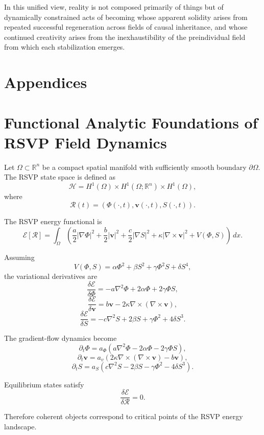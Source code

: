 \documentclass[12pt,a4paper]{article}
\begin{document}
In this unified view, reality is not composed primarily of things but of dynamically constrained acts of becoming whose apparent solidity arises from repeated successful regeneration across fields of causal inheritance, and whose continued creativity arises from the inexhaustibility of the preindividual field from which each stabilization emerges.

\newpage
\section*{Appendices}

\appendix

\section{Functional Analytic Foundations of RSVP Field Dynamics}

Let \(\Omega \subset \mathbb{R}^n\) be a compact spatial manifold with sufficiently smooth boundary \(\partial\Omega\). The RSVP state space is defined as
\[
\mathcal{H}
=
H^1(\Omega)
\times
H^1(\Omega;\mathbb{R}^n)
\times
H^1(\Omega),
\]
where
\[
\mathcal{R}(t)
=
(\Phi(\cdot,t),\mathbf{v}(\cdot,t),S(\cdot,t)).
\]

The RSVP energy functional is
\[
\mathcal{E}[\mathcal{R}]
=
\int_\Omega
\left(
\frac{a}{2}|\nabla\Phi|^2
+
\frac{b}{2}|\mathbf{v}|^2
+
\frac{c}{2}|\nabla S|^2
+
\kappa |\nabla\times\mathbf{v}|^2
+
V(\Phi,S)
\right)\,dx.
\]

Assuming
\[
V(\Phi,S)
=
\alpha\Phi^2
+
\beta S^2
+
\gamma \Phi^2S
+
\delta S^4,
\]
the variational derivatives are
\[
\frac{\delta\mathcal{E}}{\delta\Phi}
=
-a\nabla^2\Phi
+
2\alpha\Phi
+
2\gamma\Phi S,
\]
\[
\frac{\delta\mathcal{E}}{\delta\mathbf{v}}
=
b\mathbf{v}
-
2\kappa\nabla\times(\nabla\times\mathbf{v}),
\]
\[
\frac{\delta\mathcal{E}}{\delta S}
=
-c\nabla^2S
+
2\beta S
+
\gamma\Phi^2
+
4\delta S^3.
\]

The gradient-flow dynamics become
\[
\partial_t\Phi
=
a_\Phi
\left(
a\nabla^2\Phi
-
2\alpha\Phi
-
2\gamma\Phi S
\right),
\]
\[
\partial_t\mathbf{v}
=
a_v
\left(
2\kappa\nabla\times(\nabla\times\mathbf{v})
-
b\mathbf{v}
\right),
\]
\[
\partial_tS
=
a_S
\left(
c\nabla^2S
-
2\beta S
-
\gamma\Phi^2
-
4\delta S^3
\right).
\]

Equilibrium states satisfy
\[
\frac{\delta\mathcal{E}}{\delta\mathcal{R}}=0.
\]

Therefore coherent objects correspond to critical points of the RSVP energy landscape.
\end{document}
